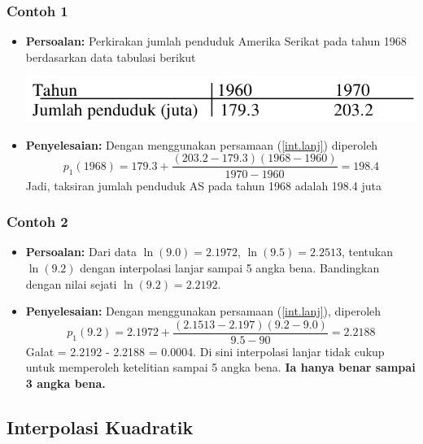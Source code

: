 \documentclass[pdflatex,compress,mathserif]{beamer}
\begin{document}
\begin{frame}
	\frametitle{Contoh 1}
	\begin{itemize}
		\item \textbf{Persoalan:} Perkirakan jumlah penduduk Amerika Serikat pada tahun 1968 berdasarkan data tabulasi berikut
		\begin{center}
			\includegraphics[width=0.8\linewidth]{img/img05}
		\end{center}
		\item \textbf{Penyelesaian:} Dengan menggunakan persamaan (\ref{int.lanj}) diperoleh
		\[ p_1(1968) = 179.3 + \frac{(203.2-179.3)(1968-1960)}{1970-1960} = 198.4 \]
		Jadi, taksiran jumlah penduduk AS pada tahun 1968 adalah 198.4 juta
	\end{itemize}
\end{frame}

\begin{frame}
	\frametitle{Contoh 2}
	\begin{itemize}
		\item \textbf{Persoalan:} Dari data $ \ln(9.0) = 2.1972 $, $ \ln(9.5) = 2.2513 $, tentukan $ \ln(9.2) $ dengan interpolasi lanjar sampai 5 angka bena. Bandingkan dengan nilai sejati $ \ln(9.2) = 2.2192 $.
		\item \textbf{Penyelesaian:} Dengan menggunakan persamaan (\ref{int.lanj}), diperoleh
		\[ p_1(9.2) = 2.1972 + \frac{(2.1513-2.197)(9.2-9.0)}{9.5-90} = 2.2188 \]
		Galat = 2.2192 - 2.2188 = 0.0004. Di sini interpolasi lanjar tidak cukup untuk memperoleh ketelitian sampai 5 angka bena. \textbf{Ia hanya benar sampai 3 angka bena.}
	\end{itemize}
\end{frame}

\subsection{Interpolasi Kuadratik}
\end{document}
